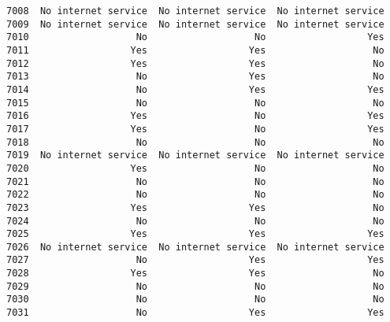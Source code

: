 \documentclass[11pt]{article}
\begin{document}
\begin{tcolorbox}[breakable, boxrule=.5pt, size=fbox, pad at break*=1mm, opacityfill=0]
\begin{Verbatim}[commandchars=\\\{\}]
7008  No internet service  No internet service  No internet service
7009  No internet service  No internet service  No internet service
7010                   No                   No                  Yes
7011                  Yes                  Yes                   No
7012                  Yes                  Yes                   No
7013                   No                  Yes                   No
7014                   No                  Yes                  Yes
7015                   No                   No                   No
7016                  Yes                   No                  Yes
7017                  Yes                   No                  Yes
7018                   No                   No                   No
7019  No internet service  No internet service  No internet service
7020                  Yes                   No                   No
7021                   No                   No                   No
7022                   No                   No                   No
7023                  Yes                  Yes                   No
7024                   No                   No                   No
7025                  Yes                  Yes                  Yes
7026  No internet service  No internet service  No internet service
7027                   No                  Yes                  Yes
7028                  Yes                  Yes                   No
7029                   No                   No                   No
7030                   No                   No                   No
7031                   No                  Yes                  Yes


\end{Verbatim}
\end{tcolorbox}
\end{document}
